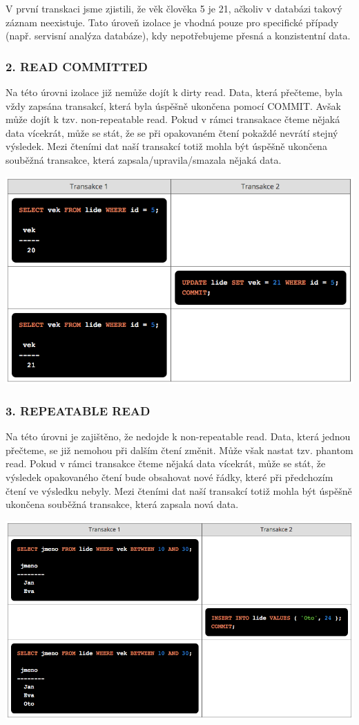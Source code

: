\documentclass[10pt,a4paper]{article}
\begin{document}
V první transkaci jsme zjistili, že věk člověka 5 je 21, ačkoliv v databázi takový záznam neexistuje.
Tato úroveň izolace je vhodná pouze pro specifické případy (např. servisní analýza databáze), kdy nepotřebujeme přesná a konzistentní data.

\subsubsection*{2. READ COMMITTED}
Na této úrovni izolace již nemůže dojít k dirty read. Data, která přečteme, byla vždy zapsána transakcí, která byla úspěšně ukončena pomocí COMMIT. Avšak může dojít k tzv. non-repeatable read. Pokud v rámci transakace čteme nějaká data vícekrát, může se stát, že se při opakovaném čtení pokaždé nevrátí stejný výsledek. Mezi čteními dat naší transakcí totiž mohla být úspěšně ukončena souběžná transakce, která zapsala/upravila/smazala nějaká data.

\includegraphics[scale=0.5]{img/ReadCommited}

\subsubsection*{3. REPEATABLE READ}
Na této úrovni je zajištěno, že nedojde k non-repeatable read. Data, která jednou přečteme, se již nemohou při dalším čtení změnit. Může však nastat tzv. phantom read. Pokud v rámci transakce čteme nějaká data vícekrát, může se stát, že výsledek opakovaného čtení bude obsahovat nové řádky, které při předchozím čtení ve výsledku nebyly. Mezi čteními dat naší transakcí totiž mohla být úspěšně ukončena souběžná transakce, která zapsala nová data.

\includegraphics[scale=0.5]{img/RepeatableRead}
\end{document}

